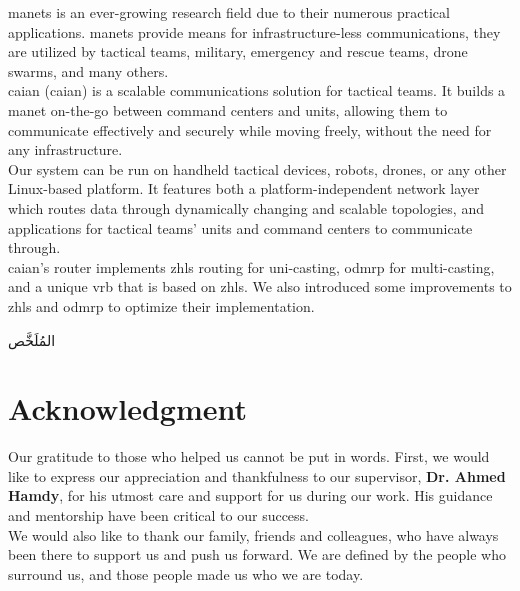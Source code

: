 \quad \acrfull{manets} is an ever-growing research field due to their numerous practical applications. \acrshort{manets} provide means for infrastructure-less communications, they are utilized by tactical teams, military, emergency and rescue teams, drone swarms, and many others. \\

\acrshort{caian} (\acrlong{caian}) is a scalable communications solution for tactical teams. It builds a \acrshort{manet} on-the-go between command centers and units, allowing them to communicate effectively and securely while moving freely, without the need for any infrastructure. \\

Our system can be run on handheld tactical devices, robots, drones, or any other Linux-based platform. It features both a platform-independent network layer which routes data through dynamically changing and scalable topologies, and applications for tactical teams’ units and command centers to communicate through. \\

\acrshort{caian}'s router implements \acrfull{zhls} routing for uni-casting, \acrfull{odmrp} for multi-casting, and a unique \acrfull{vrb} that is based on \acrshort{zhls}. We also introduced some improvements to \acrshort{zhls} and \acrshort{odmrp} to optimize their implementation.

\newpage

\begin{arabtext}
{\huge
المُلَخَّص
}\vspace{20pt}

\end{arabtext}
\newpage

\section*{Acknowledgment}
\quad Our gratitude to those who helped us cannot be put in words. First, we would like to express our appreciation and thankfulness to our supervisor, \textbf{Dr. Ahmed Hamdy}, for his utmost care and support for us during our work. His guidance and mentorship have been critical to our success. \\

We would also like to thank our family, friends and colleagues, who have always been there to support us and push us forward. We are defined by the people who surround us, and those people made us who we are today.
\newpage


